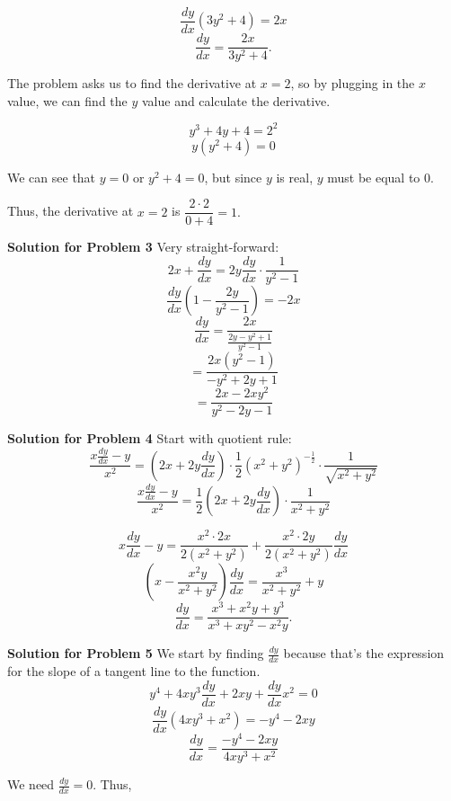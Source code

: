 \documentclass{article}
\newcommand \der {\frac {dy} {dx}}
\newcommand \dder {\dfrac {dy} {dx}}
\begin{document}
\[ \der \left( 3y^2 + 4 \right) = 2x \]
\[ \der = \frac {2x} {3y^{2} + 4}. \]

The problem asks us to find the derivative at $x = 2$, so by plugging in the $x$ value, we can find the $y$ value and calculate the derivative.

\[ y^3 + 4y + 4 = 2^2 \]
\[ y\left( y^2 + 4 \right) = 0 \]

We can see that $y = 0$ or $y^2 + 4 = 0$, but since $y$ is real, $y$ must be equal to $0$.

Thus, the derivative at $x = 2$ is $\dfrac {2 \cdot 2} {0 + 4} = \boxed{1}.$

\newpage

\textbf{Solution for Problem 3} Very straight-forward:\\

\[ 2x + \der = 2y \der \cdot \frac {1} {y^2 - 1} \]
\[ \der \left( 1 - \frac {2y} {y^2 - 1} \right) = -2x \]
\[ \der = \dfrac {2x} {\frac {2y - y^2 + 1} {y^2 - 1}} \]
\[ = \dfrac {2x\left( y^2 - 1 \right)} {-y^2 + 2y + 1} \]
\[ = \dfrac {2x - 2xy^{2}} {y^2 - 2y - 1} \]

\vspace{1cm}

\textbf{Solution for Problem 4} Start with quotient rule: \\

\[ \dfrac {x\der - y} {x^2} = \left( 2x + 2y\der \right) \cdot \frac {1} {2} \left( x^2 + y^2 \right)^{- \frac {1} {2}} \cdot \dfrac {1} {\sqrt {x^2 + y^2}} \]
\[ \dfrac {x\der - y} {x^2} = \frac {1} {2} \left( 2x + 2y\der \right) \cdot \dfrac {1} {x^2 + y^2} \]

\[ x\der - y = \dfrac {x^2 \cdot 2x} {2\left( x^2 + y^2 \right)} + \dfrac {x^2 \cdot 2y} {2 \left( x^2 + y^2 \right)} \der \]
\[ \left( x - \dfrac {x^2y} {x^2 + y^2} \right)\dder = \frac {x^3} {x^2 + y^2} + y \]
\[ \boxed{\dder = \dfrac {x^3 + x^2y + y^3} {x^3 + xy^2 - x^2y}}. \]


\vspace{1cm}

\newpage

\textbf{Solution for Problem 5} We start by finding $\der$ because that's the expression for the slope of a tangent line to the function. \\

\[ y^4 + 4xy^3\der + 2xy + \der x^2 = 0 \]
\[ \der \left( 4xy^3 + x^2 \right) = -y^4 - 2xy \]
\[ \der = \dfrac {-y^4 - 2xy} {4xy^3 + x^2} \]

We need $\der = 0$. Thus,
\end{document}
